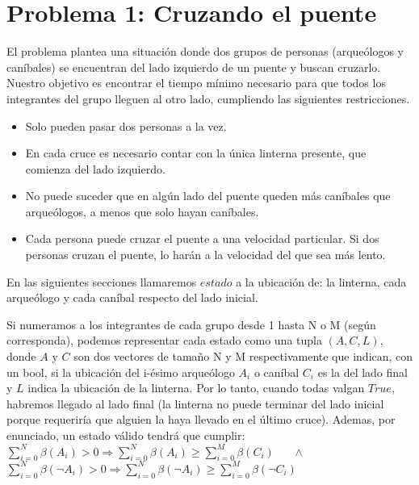 \section{Problema 1: Cruzando el puente}

    El problema plantea una situación donde dos grupos de personas (arqueólogos y caníbales) se encuentran del lado izquierdo de un puente y buscan cruzarlo. Nuestro objetivo es encontrar el tiempo mínimo necesario para que todos los integrantes del grupo lleguen al otro lado, cumpliendo las siguientes restricciones.

            \begin{itemize}
                \item Solo pueden pasar dos personas a la vez.
                \item En cada cruce es necesario contar con la única linterna presente, que comienza del lado izquierdo.
                \item No puede suceder que en algún lado del puente queden más caníbales que arqueólogos, a menos que solo hayan caníbales.
                \item Cada persona puede cruzar el puente a una velocidad particular. Si dos personas cruzan el puente, lo harán a la velocidad del que sea más lento.
            \end{itemize}

        En las siguientes secciones llamaremos $estado$ a la ubicación de: la linterna, cada arqueólogo y cada caníbal respecto del lado inicial.

        Si numeramos a los integrantes de cada grupo desde 1 hasta N o M (según corresponda), podemos representar cada estado como una tupla $(A,C,L)$, donde $A$ y $C$ son dos vectores de tamaño N y M respectivamente que indican, con un bool, si la ubicación del i-ésimo arqueólogo $A_i$ o caníbal $C_i$ es la del lado final y $L$  indica la ubicación de la linterna. Por lo tanto, cuando todas valgan $True$, habremos llegado al lado final (la linterna no puede terminar del lado inicial porque requeriría que alguien la haya llevado en el último cruce). Ademas, por enunciado, un estado válido tendrá que cumplir:
        \\

        $\sum_{i=0}^{N}\beta(A_i) > 0 \Rightarrow \sum_{i=0}^{N}\beta(A_i) \ge \sum_{i=0}^{M}\beta(C_i)  $
        \ \ \
        $\wedge$
        \ \ \
        $\sum_{i=0}^{N}\beta(\neg A_i) > 0 \Rightarrow \sum_{i=0}^{N}\beta(\neg A_i) \ge \sum_{i=0}^{M}\beta(\neg C_i)$
        \\

